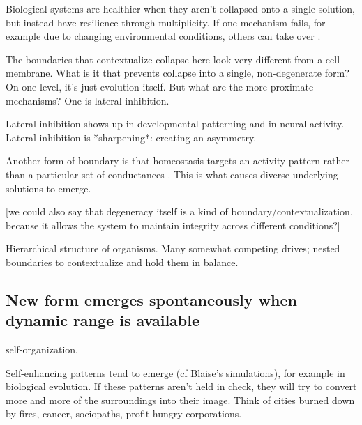 Biological systems are healthier when they aren't collapsed onto a single solution, but instead have resilience through multiplicity. If one mechanism fails, for example due to changing environmental conditions, others can take over \citep{edelman2001degeneracy, albantakis2024brain}. 

The boundaries that contextualize collapse here look very different from a cell membrane. What is it that prevents collapse into a single, non-degenerate form? On one level, it's just evolution itself. But what are the more proximate mechanisms? One is lateral inhibition. 

Lateral inhibition shows up in developmental patterning and in neural activity. Lateral inhibition is *sharpening*: creating an asymmetry. 

Another form of boundary is that homeostasis targets an activity pattern rather than a particular set of conductances \citep{o2013correlations}. This is what causes diverse underlying solutions to emerge. 

[we could also say that degeneracy itself is a kind of boundary/contextualization, because it allows the system to maintain integrity across different conditions?]




Hierarchical structure of organisms. Many somewhat competing drives; nested boundaries to contextualize and hold them in balance.



\subsection{New form emerges spontaneously when dynamic range is available}

self-organization. 

Self-enhancing patterns tend to emerge (cf Blaise's simulations), for example in biological evolution. If these patterns aren't held in check, they will try to convert more and more of the surroundings into their image. Think of cities burned down by fires, cancer, sociopaths, profit-hungry corporations. 

